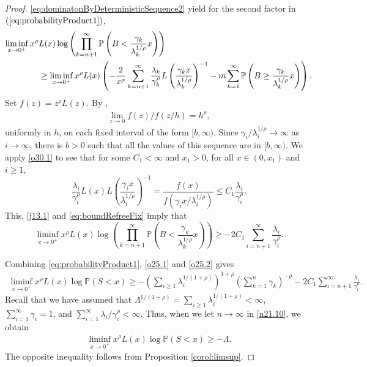 \documentclass[bj]{imsart}
\numberwithin{equation}{section}
\renewcommand{\P}{\mathbb{P}}
\newcommand{\1}{\mathbf{1}}
\theoremstyle{definition}
\begin{document}
\begin{proof}
\eqref{eq:dominatonByDeterministicSequence2}
yield for the second factor in $(\ref{eq:probabilityProduct1})$,
\begin{align}\notag
\liminf_{x\to 0^+}  x^\rho& L(x) \log\left(
\prod_{k=n+1}^{\infty}\P\left(B<\frac{\gamma_{k}}{\lambda_{k}^{1/\rho}}x\right) 
\right)\\
& \geq\liminf_{x\to 0^+}x^\rho L(x) 
\left(
-\frac{2}{x^\rho}\sum_{k=n+1}^\infty\frac{\lambda_k}{\gamma_k^\rho}L\left(\frac{\gamma_kx}{\lambda_k^{1/\rho}}\right)^{-1}-m\sum_{k=1}^\infty\P\left(B\geq\frac{\gamma_{k}}{\lambda_{k}^{1/\rho}}x\right)
\right).\label{eq:boundRefreeFix}
\end{align} 
Set $f(z)=z^{\rho}L(z)$. By \cite[Thm 1.5.2]{regularVariation}, 
\begin{align}\label{o30.1}
\lim_{z\to0} f(z)/f(z/h)= h^\rho,
\end{align}
 uniformly in $h$, on each fixed interval of the form $[b,\infty)$. Since $\gamma_i/\lambda_i^{1/\rho}\to \infty$ as $i\to \infty$, there is $b>0$ such that all the values of this sequence are in $[b,\infty)$. We apply \eqref{o30.1} to see that for some $C_1< \infty$ and $x_1>0$, for all $x\in(0, x_1)$ and $i\geq 1$,
\begin{equation}
\frac{\lambda_i}{\gamma_i^\rho}L(x)L\left(\frac{\gamma_ix}{\lambda_i^{1/\rho}}\right)^{-1}
=
\frac{f(x)}{f\left(\gamma_ix/\lambda_i^{1/\rho}\right)}
\leq C_1 \frac{\lambda_i}{\gamma_i^\rho}. \label{eq:uniformBound}
\end{equation}
This, \eqref{j13.1} and \eqref{eq:boundRefreeFix} imply that
\begin{equation}
\liminf_{x\to 0^+}  x^\rho L(x) \log\left(
\prod_{k=n+1}^{\infty}\P\left(B<\frac{\gamma_{k}}{\lambda_{k}^{1/\rho}}x\right) 
\right)
\geq  -2C_1\sum_{i=n+1}^{\infty}\frac{\lambda_i}{\gamma_i^\rho}.\label{o25.2} 
\end{equation}


Combining \eqref{eq:probabilityProduct1}, \eqref{o25.1} and \eqref{o25.2} gives
\begin{align}\label{n21.10}
\liminf_{x\to 0^+}x^\rho L(x) \log \P(S<x) \geq-
\left(\sum_{i\geq 1}\lambda_i^{1/(1+\rho)}\right)^{1+\rho} \left(\sum_{k=1}^n\gamma_k\right)^{-\rho} -2C_1\sum_{i=n+1}^{\infty}\frac{\lambda_i}{\gamma_i^\rho}.
\end{align}
Recall that we have assumed that $\Lambda^{1/(1+\rho)} =\sum_{i\geq 1}\lambda_i^{1/(1+\rho)}<\infty$, $\sum_{i=1}^\infty\gamma_i=1$,
 and $\sum_{i=1}^{\infty}\lambda_i/\gamma_i^\rho<\infty$.
Thus, when we let $n\to \infty$ in \eqref{n21.10}, we obtain
\begin{align*}%
\liminf_{x\to 0^+}x^\rho L(x)\log \P(S<x) \geq-\Lambda.
\end{align*}
The opposite inequality follows from Proposition \ref{corol:limsup}.
\end{proof}
\end{document}
